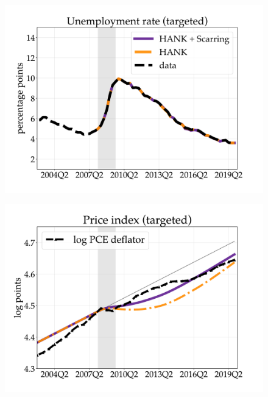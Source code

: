 \begin{figure}[H] %
\centering
\begin{minipage}{0.51\textwidth}
\includegraphics[scale=.29]{text/chapter1/Figures/GR_sim/Cleaner/Urate_vs_data_large_new}
 \label{fig:a}
\end{minipage}\hspace*{\fill}
\begin{minipage}{0.51\textwidth}
\includegraphics[scale=.29]{text/chapter1/Figures/GR_sim/Cleaner/price_vs_data_large_new}
 \label{fig:b}
\end{minipage}
\medskip
\begin{minipage}{0.51\textwidth}

\end{minipage}
\end{figure}
